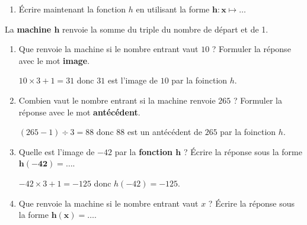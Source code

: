 \begin{exercice}
\begin{enumerate}
            \medskip
        \item Écrire maintenant la fonction $h$ en utilisant la forme $\boldsymbol{h:x} \longmapsto \ldots$
    \end{enumerate}
\end{exercice}
\begin{corrige}
    La \textbf{machine $\boldsymbol{h}$} renvoie la somme du triple du nombre de départ et de 1.

    \hspace*{-15mm}
    \begin{enumerate}
        \item Que renvoie la machine si le nombre entrant vaut $10$ ? Formuler la réponse avec le mot \textbf{image}.
        
        {\red $10\times 3 + 1 = 31$ donc $31$ est l'image de $10$ par la  foinction $h$.}
    \end{enumerate}
    \Coupe  
    \begin{enumerate}
    \setcounter{enumi}{1}        
        \item Combien vaut le nombre entrant si la machine renvoie  $265$ ? Formuler la réponse avec le mot \textbf{antécédent}.
        
        {\red $(265-1)\div 3 = 88$ donc $88$ est un antécédent de $265$ par la  foinction $h$.}
        \item Quelle est l'image de $-42$ par la \textbf{fonction $\boldsymbol{h}$} ? Écrire la réponse sous la forme $\boldsymbol{h(-42)=\ldots}$.
        
        {\red $-42\times 3 + 1 = -125$ donc $h(-42)=-125$.}
        \item Que renvoie la machine si le nombre entrant vaut $x$ ? Écrire la réponse sous la forme $\boldsymbol{h(x)=\ldots}$.
        

\end{enumerate}
\end{corrige}
